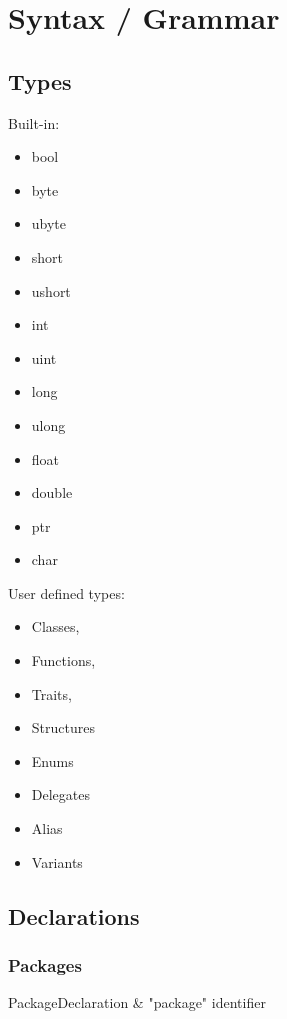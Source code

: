 \section{Syntax / Grammar}

 
\subsection{Types}
Built-in:
\begin{multicols}{4}
\begin{itemize}
\item bool 
\item byte 
\item ubyte 
\item short 
\item ushort 
\item int 
\item uint 
\item long 
\item ulong 
\item float 
\item double 
\item ptr 
\item char 
\end{itemize}
\end{multicols}

User defined types:
\begin{itemize}
\item Classes, 
\item Functions, 
\item Traits, 
\item Structures
\item Enums
\item Delegates
\item Alias
\item Variants
\end{itemize}

\subsection{Declarations}

\subsubsection{Packages}

\begin{ebnf}
PackageDeclaration & \rightarrow "package" identifier\; \\
\end{ebnf}

